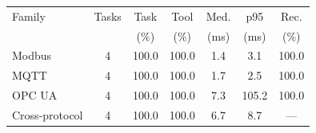     \begin{tabular}{@{}lcccccc@{}}
        \toprule
        Family & Tasks & Task & Tool & Med. & p95 & Rec. \\
        & & (\%) & (\%) & (ms) & (ms) & (\%) \\
        \midrule
        Modbus & 4 & 100.0 & 100.0 & 1.4 & 3.1 & 100.0 \\
        MQTT & 4 & 100.0 & 100.0 & 1.7 & 2.5 & 100.0 \\
        OPC UA & 4 & 100.0 & 100.0 & 7.3 & 105.2 & 100.0 \\
        Cross-protocol & 4 & 100.0 & 100.0 & 6.7 & 8.7 & --- \\
        \bottomrule
    \end{tabular}
